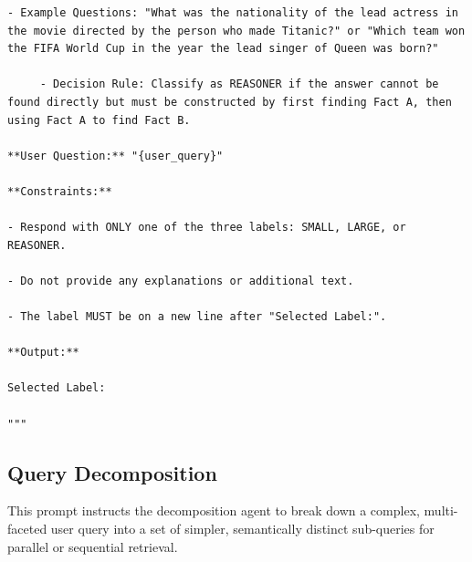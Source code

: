 \documentclass[11pt]{article}
\begin{document}
\begin{lstlisting}[basicstyle=\scriptsize\ttfamily]
     - Example Questions: "What was the nationality of the lead actress in the movie directed by the person who made Titanic?" or "Which team won the FIFA World Cup in the year the lead singer of Queen was born?"

     - Decision Rule: Classify as REASONER if the answer cannot be found directly but must be constructed by first finding Fact A, then using Fact A to find Fact B.

**User Question:** "{user_query}"

**Constraints:**

- Respond with ONLY one of the three labels: SMALL, LARGE, or REASONER.

- Do not provide any explanations or additional text.

- The label MUST be on a new line after "Selected Label:".

**Output:**

Selected Label:

"""
\end{lstlisting}

\subsection{Query Decomposition}

This prompt instructs the decomposition agent to break down a complex, multi-faceted user query into a set of simpler, semantically distinct sub-queries for parallel or sequential retrieval.
\end{document}
